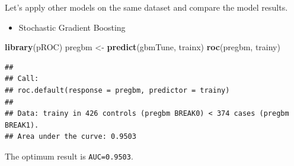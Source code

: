 \documentclass[]{book}
\newenvironment{Shaded}{\begin{snugshade}}{\end{snugshade}}
\newcommand{\KeywordTok}[1]{\textcolor[rgb]{0.13,0.29,0.53}{\textbf{{#1}}}}
\newcommand{\DataTypeTok}[1]{\textcolor[rgb]{0.13,0.29,0.53}{{#1}}}
\newcommand{\DecValTok}[1]{\textcolor[rgb]{0.00,0.00,0.81}{{#1}}}
\newcommand{\FloatTok}[1]{\textcolor[rgb]{0.00,0.00,0.81}{{#1}}}
\newcommand{\StringTok}[1]{\textcolor[rgb]{0.31,0.60,0.02}{{#1}}}
\newcommand{\OtherTok}[1]{\textcolor[rgb]{0.56,0.35,0.01}{{#1}}}
\newcommand{\NormalTok}[1]{{#1}}
\providecommand{\tightlist}{%
  \setlength{\itemsep}{0pt}\setlength{\parskip}{0pt}}
\theoremstyle{definition}
\theoremstyle{definition}
\theoremstyle{remark}
\begin{document}
Let's apply other models on the same dataset and compare the model
results.

\begin{itemize}
\tightlist
\item
  Stochastic Gradient Boosting
\end{itemize}

\begin{Shaded}
\end{Shaded}

\begin{Shaded}
\begin{Highlighting}[]
\KeywordTok{library}\NormalTok{(pROC)}
\NormalTok{pregbm <-}\StringTok{ }\KeywordTok{predict}\NormalTok{(gbmTune, trainx)}
\KeywordTok{roc}\NormalTok{(pregbm, trainy)}
\end{Highlighting}
\end{Shaded}

\begin{verbatim}
## 
## Call:
## roc.default(response = pregbm, predictor = trainy)
## 
## Data: trainy in 426 controls (pregbm BREAK0) < 374 cases (pregbm BREAK1).
## Area under the curve: 0.9503
\end{verbatim}

The optimum result is \texttt{AUC=0.9503}.
\end{document}

